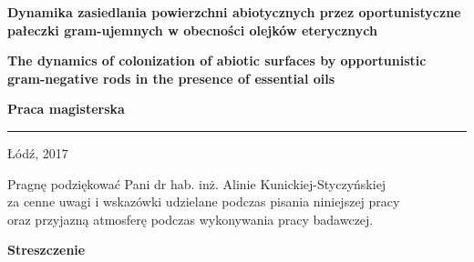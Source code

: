 \documentclass[11pt,a4paper]{report}
\begin{document}
\begin{titlepage}
\vskip 12pt
\vskip 12pt
\begin{center}
{\bf \huge Dynamika zasiedlania powierzchni abiotycznych przez oportunistyczne pałeczki gram-ujemnych w obecności olejków eterycznych}
\end{center}
\begin{center}
{\bf \Large The dynamics of colonization of abiotic surfaces by opportunistic gram-negative rods in the presence of essential oils}
\vskip 30pt
\end{center}
\begin{spacing}{1.1}
\vskip 12pt
\vskip 12pt
\begin{flushleft}
{\bf \Large Praca magisterska}
\end{flushleft}
\vskip 62pt
\begin{flushleft}
\vskip -46pt
\vskip -8pt
\end{flushleft}
\end{spacing}
\vfill
\noindent
\rule[-2pt]{\textwidth}{.1mm}
\begin{center}
Łódź, 2017
\end{center}
\end{titlepage}
\newpage
\null
\vskip 380pt
\begin{flushright}
Pragnę podziękować Pani dr hab. inż. Alinie Kunickiej-Styczyńskiej\\
za cenne uwagi i wskazówki udzielane podczas pisania niniejszej pracy\\
oraz przyjazną atmosferę podczas wykonywania pracy badawczej.
\end{flushright}

\begin{spacing}{1}
\tableofcontents
\end{spacing}

\newpage
\vskip 36pt
\vskip 36pt
\vskip 36pt
\vskip 36pt
\vskip 36pt
\vskip 36pt
\begin{center}
{\bf \huge Streszczenie}\\
\end{center}
\vskip 36pt
\end{document}
